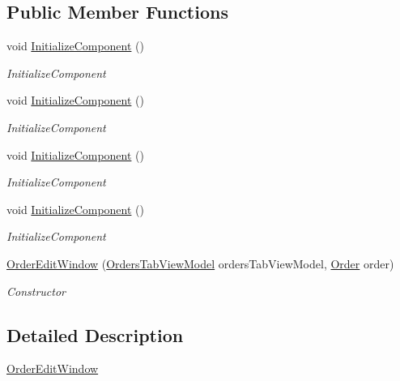 \subsection*{Public Member Functions}
\begin{DoxyCompactItemize}
\item 
void \hyperlink{class_baudi_1_1_client_1_1_view_1_1_edit_windows_1_1_order_edit_window_a4a7b24a68d74ac9d0c0321904b5fdda7}{Initialize\+Component} ()
\begin{DoxyCompactList}\small\item\em Initialize\+Component \end{DoxyCompactList}\item 
void \hyperlink{class_baudi_1_1_client_1_1_view_1_1_edit_windows_1_1_order_edit_window_a4a7b24a68d74ac9d0c0321904b5fdda7}{Initialize\+Component} ()
\begin{DoxyCompactList}\small\item\em Initialize\+Component \end{DoxyCompactList}\item 
void \hyperlink{class_baudi_1_1_client_1_1_view_1_1_edit_windows_1_1_order_edit_window_a4a7b24a68d74ac9d0c0321904b5fdda7}{Initialize\+Component} ()
\begin{DoxyCompactList}\small\item\em Initialize\+Component \end{DoxyCompactList}\item 
void \hyperlink{class_baudi_1_1_client_1_1_view_1_1_edit_windows_1_1_order_edit_window_a4a7b24a68d74ac9d0c0321904b5fdda7}{Initialize\+Component} ()
\begin{DoxyCompactList}\small\item\em Initialize\+Component \end{DoxyCompactList}\item 
\hyperlink{class_baudi_1_1_client_1_1_view_1_1_edit_windows_1_1_order_edit_window_af3af353be24aaa8ebd099199c438a093}{Order\+Edit\+Window} (\hyperlink{class_baudi_1_1_client_1_1_view_models_1_1_tabs_view_models_1_1_orders_tab_view_model}{Orders\+Tab\+View\+Model} orders\+Tab\+View\+Model, \hyperlink{class_baudi_1_1_d_a_l_1_1_models_1_1_order}{Order} order)
\begin{DoxyCompactList}\small\item\em Constructor \end{DoxyCompactList}\end{DoxyCompactItemize}


\subsection{Detailed Description}
\hyperlink{class_baudi_1_1_client_1_1_view_1_1_edit_windows_1_1_order_edit_window}{Order\+Edit\+Window} 



